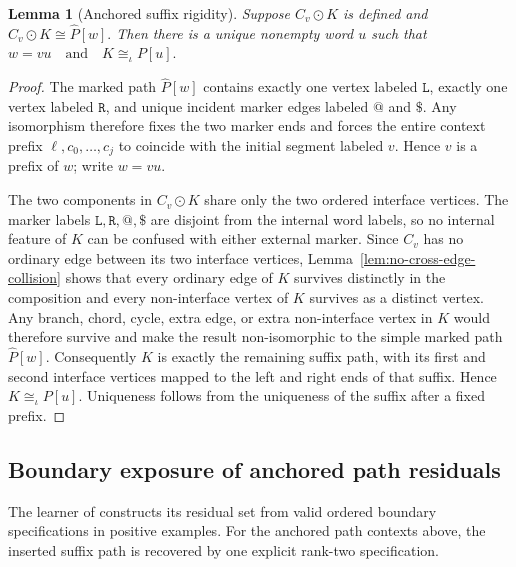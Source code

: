\documentclass[11pt]{article}
\newtheorem{lemma}[theorem]{Lemma}
\theoremstyle{definition}
\theoremstyle{remark}
\begin{document}
\begin{lemma}[Anchored suffix rigidity]\label{lem:suffix}
Suppose \(C_v\odot K\) is defined and
\(C_v\odot K\cong\widehat P[w].\)
Then there is a unique nonempty word \(u\) such that
\(w=vu \quad\text{and}\quad K\cong_\iota P[u].\)
\end{lemma}

\begin{proof}
The marked path \(\widehat P[w]\) contains exactly one vertex labeled
\(\mathtt L\), exactly one vertex labeled \(\mathtt R\), and unique incident
marker edges labeled \(\mathtt{@}\) and \(\mathtt{\$}\). Any isomorphism
therefore fixes the two marker ends and forces the entire context prefix
\(\ell,c_0,\ldots,c_j\)
to coincide with the initial segment labeled \(v\). Hence \(v\) is a prefix
of \(w\); write \(w=vu\).

The two components in \(C_v\odot K\) share only the two ordered interface
vertices. The marker labels \(\mathtt L,\mathtt R,\mathtt{@},\mathtt{\$}\)
are disjoint from the internal word labels, so no internal feature of \(K\)
can be confused with either external marker.  Since \(C_v\) has no ordinary
edge between its two interface vertices, Lemma~\ref{lem:no-cross-edge-collision}
shows that every ordinary edge of \(K\) survives distinctly in the composition
and every non-interface vertex of \(K\) survives as a distinct vertex.  Any
branch, chord, cycle, extra edge, or extra non-interface vertex in \(K\) would
therefore survive and make the result non-isomorphic to the simple marked path
\(\widehat P[w]\). Consequently \(K\) is exactly the remaining suffix path,
with its first and second interface vertices mapped to the left and right ends
of that suffix. Hence \(K\cong_\iota P[u]\). Uniqueness follows from the
uniqueness of the suffix after a fixed prefix.
\end{proof}

\subsection{Boundary exposure of anchored path residuals}

The learner of \cite{ShoudaiEtAl2026} constructs its residual set from valid
ordered boundary specifications in positive examples.  For the anchored path
contexts above, the inserted suffix path is recovered by one explicit
rank-two specification.
\end{document}
